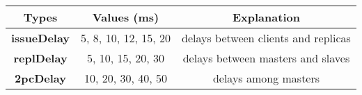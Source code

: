 \begin{table}[!t]
  \centering
  \renewcommand*{\arraystretch}{1.2}
  \begin{tabular}{|c||c|c|}
	\hline
	{\bf Types}		& {\bf Values (ms)}	& {\bf Explanation}
	\\ \hline \hline
	{\bf issueDelay}	& 5, 8, 10, 12, 15, 20	& delays between clients and replicas
	\\ \hline
	{\bf replDelay}	& 5, 10, 15, 20, 30 	& delays between masters and slaves
	\\ \hline
	{\bf 2pcDelay}	& 10, 20, 30, 40, 50 	& delays among masters
	\\ \hline
  \end{tabular}
\end{table}
